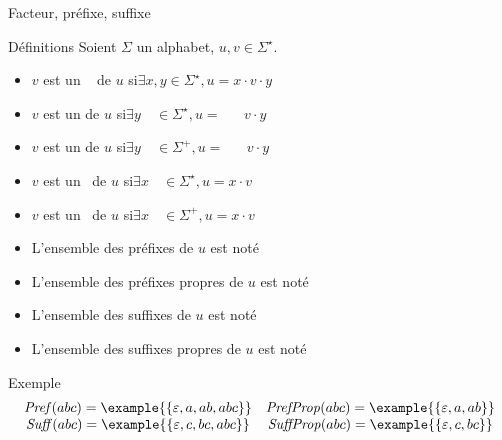 
\begingroup

\begin{frame}{Facteur, préfixe, suffixe}
  
  \begin{block}{Définitions}
    Soient $\Sigma$ un alphabet, $u, v \in \Sigma^\star$.
    \begin{itemize}
    \item $v$ est un  \phantom{propr}\,\,\, de $u$ si\quad \alert{$\exists x, y           \in \Sigma^\star, u = x \cdot v \cdot y$}
    \item $v$ est un  \phantom{propre}      de $u$ si\quad \alert{$\exists y\phantom{, x} \in \Sigma^\star, u = \phantom {w \cdot }\; v \cdot y$}
    \item $v$ est un                 de $u$ si\quad \alert{$\exists y\phantom{, x} \in \Sigma^+,    u = \phantom{ w \cdot }\; v \cdot y$}
    \item $v$ est un  \phantom{propre}\,    de $u$ si\quad \alert{$\exists x\phantom{, y} \in \Sigma^\star, u = x \cdot v$}
    \item $v$ est un \,              de $u$ si\quad \alert{$\exists x\phantom{, y} \in \Sigma^+,    u = x \cdot v$}
      
    \item L'ensemble des préfixes de $u$ est noté 
    \item L'ensemble des préfixes propres de $u$ est noté 
    \item L'ensemble des suffixes de $u$ est noté 
    \item L'ensemble des suffixes propres de $u$ est noté 
    \end{itemize}
  \end{block}

  \begin{exampleblock}{Exemple}\vspace{-2mm}
    $$\begin{array}{cc}
    \mathit{Pref}(abc) = \example{\{\varepsilon, a, ab, abc\}} & \mathit{PrefProp}(abc) = \example{\{\varepsilon, a, ab\}}\\
    \mathit{Suff}(abc) = \example{\{\varepsilon, c, bc, abc\}} & \mathit{SuffProp}(abc) = \example{\{\varepsilon, c, bc\}}
    \end{array}$$
  \end{exampleblock}

\end{frame}

\endgroup
\endinput
